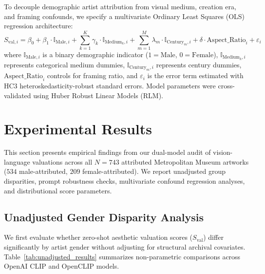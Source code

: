 \documentclass[pdflatex,sn-mathphys-num]{sn-jnl}%
\theoremstyle{thmstyleone}%
\theoremstyle{thmstyletwo}%
\theoremstyle{thmstylethree}%
\begin{document}
To decouple demographic artist attribution from visual medium, creation era, and framing confounds, we specify a multivariate Ordinary Least Squares (OLS) regression architecture:
\begin{equation}
S_{\text{val}, i} = \beta_0 + \beta_1 \cdot \mathbb{I}_{\text{Male}, i} + \sum_{k=1}^{K} \gamma_k \cdot \mathbb{I}_{\text{Medium}_{k}, i} + \sum_{m=1}^{M} \lambda_m \cdot \mathbb{I}_{\text{Century}_{m}, i} + \delta \cdot \text{Aspect\_Ratio}_i + \varepsilon_i
\end{equation}
where $\mathbb{I}_{\text{Male}, i}$ is a binary demographic indicator ($1 = \text{Male}$, $0 = \text{Female}$), $\mathbb{I}_{\text{Medium}_{k}, i}$ represents categorical medium dummies, $\mathbb{I}_{\text{Century}_{m}, i}$ represents century dummies, $\text{Aspect\_Ratio}_i$ controls for framing ratio, and $\varepsilon_i$ is the error term estimated with HC3 heteroskedasticity-robust standard errors. Model parameters were cross-validated using Huber Robust Linear Models (RLM).


\section{Experimental Results}
\label{sec:results}

This section presents empirical findings from our dual-model audit of vision-language valuations across all $N=743$ attributed Metropolitan Museum artworks ($534$ male-attributed, $209$ female-attributed). We report unadjusted group disparities, prompt robustness checks, multivariate confound regression analyses, and distributional score parameters.

\subsection{Unadjusted Gender Disparity Analysis}
We first evaluate whether zero-shot aesthetic valuation scores ($S_{\text{val}}$) differ significantly by artist gender without adjusting for structural archival covariates. Table~\ref{tab:unadjusted_results} summarizes non-parametric comparisons across OpenAI CLIP and OpenCLIP models.
\end{document}
